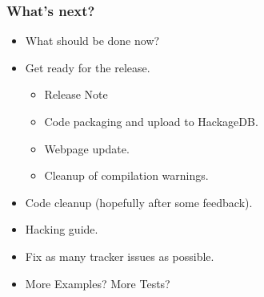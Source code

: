 \documentclass{beamer}
\begin{document}
\begin{frame}
  \frametitle{What's next?}
 \begin{itemize}
 \item What should be done now? 
 \item Get ready for the release.
   \begin{itemize}
     \item Release Note
     \item Code packaging and upload to HackageDB.
     \item Webpage update.
     \item Cleanup of compilation warnings.
   \end{itemize}
 \item Code cleanup (hopefully after some feedback).
 \item Hacking guide.
 \item Fix as many tracker issues as possible.
 \item More Examples? More Tests?
 \end{itemize}
\end{frame}
\end{document}
